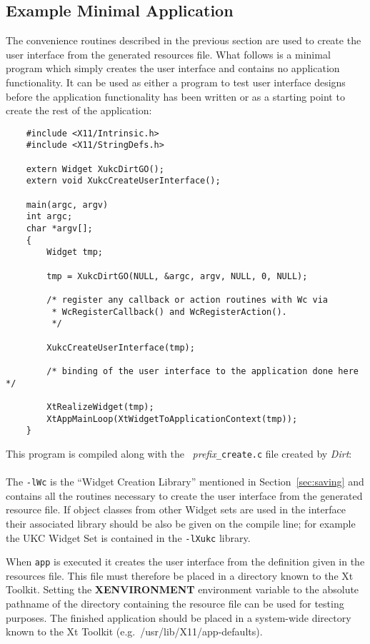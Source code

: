 \subsection{Example Minimal Application}
\label{sec:minimal-app}
The convenience routines described in the previous section are used to 
create the user interface from the generated resources file.  What 
follows is a minimal program which simply creates the user interface and 
contains no application functionality.  It can be used as either a 
program to test user interface designs before the application 
functionality has been written or as a starting point to create the rest 
of the application:\begin{verbatim}
    #include <X11/Intrinsic.h>
    #include <X11/StringDefs.h>

    extern Widget XukcDirtGO();
    extern void XukcCreateUserInterface();

    main(argc, argv)
    int argc;
    char *argv[];
    {
        Widget tmp;

        tmp = XukcDirtGO(NULL, &argc, argv, NULL, 0, NULL);

        /* register any callback or action routines with Wc via
         * WcRegisterCallback() and WcRegisterAction().
         */

        XukcCreateUserInterface(tmp);

        /* binding of the user interface to the application done here */

        XtRealizeWidget(tmp);
        XtAppMainLoop(XtWidgetToApplicationContext(tmp));
    }
\end{verbatim}
This program is compiled along with the ~{\em prefix}{\tt \_create.c} 
file created by {\em Dirt}:\\
\\
The {\tt -lWc} 
is the ``Widget Creation Library'' mentioned in Section~\ref{sec:saving} 
and contains all the routines necessary to create the user interface 
from the generated resource file.  If object classes from other Widget 
sets are used in the interface their associated library should be also 
be given on the compile line; for example the UKC Widget Set is 
contained in the {\tt -lXukc} library.

When {\tt app} is executed it creates the user interface from the 
definition given in the resources file.  This file must therefore be 
placed in a directory known to the Xt Toolkit.  Setting the {\bf 
XENVIRONMENT} environment variable to the absolute pathname of the 
directory containing the resource file can be used for testing purposes.  
The finished application should be placed in a system-wide directory 
known to the Xt Toolkit (e.g.\ /usr/lib/X11/app-defaults).


